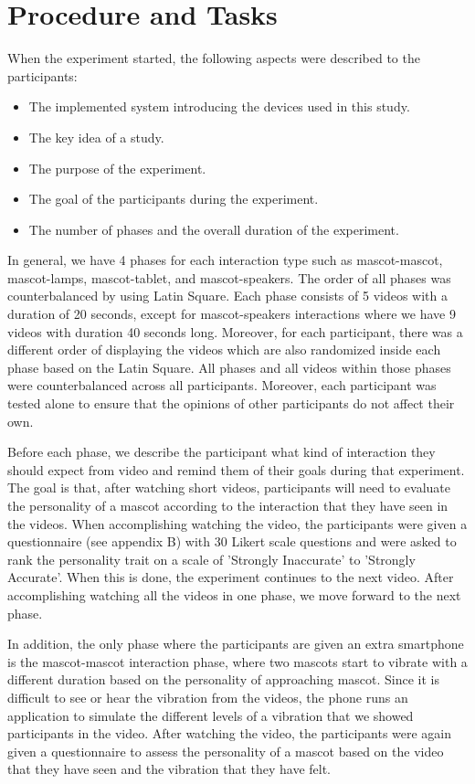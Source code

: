 \section{Procedure and Tasks}
\label{sec:procedure-and-tasks}
When the experiment started, the following aspects were described to the participants:
\begin{itemize}
  \item The implemented system introducing the devices used in this study.
  \item The key idea of a study.
  \item The purpose of the experiment.
  \item The goal of the participants during the experiment.
  \item The number of phases and the overall duration of the experiment.
\end{itemize}


In general, we have 4 phases for each interaction type such as mascot-mascot,
mascot-lamps, mascot-tablet, and mascot-speakers.
The order of all phases was counterbalanced by using Latin Square.
Each phase consists of 5 videos with a duration of 20 seconds, except for mascot-speakers
interactions where we have 9 videos with duration 40 seconds long.
Moreover, for each participant, there was a different order of displaying the videos
which are also randomized inside each phase based on the Latin Square.
All phases and all videos within those phases were counterbalanced across all participants.
Moreover, each participant was tested alone to ensure that the opinions of other participants do not affect their own.

Before each phase, we describe the participant what kind of interaction they should
expect from video and remind them of their goals during that experiment.
The goal is that, after watching short videos, participants will need to evaluate the personality
of a mascot according to the interaction that they have seen in the videos.
When accomplishing watching the video, the participants were given a questionnaire
(see appendix B) with 30 Likert scale questions and were asked to rank the personality trait
on a scale of 'Strongly Inaccurate' to 'Strongly Accurate'.
When this is done, the experiment continues to the next video.
After accomplishing watching all the videos in one phase, we move forward to the next phase.

In addition, the only phase where the participants are given an extra smartphone
is the mascot-mascot interaction phase, where two mascots start to vibrate
with a different duration based on the personality of approaching mascot.
Since it is difficult to see or hear the vibration from the videos, the phone runs an
application to simulate the different levels of a vibration that we showed participants in the video.
After watching the video, the participants were again given a questionnaire to assess
the personality of a mascot based on the video that they have seen and the vibration that they have felt.

